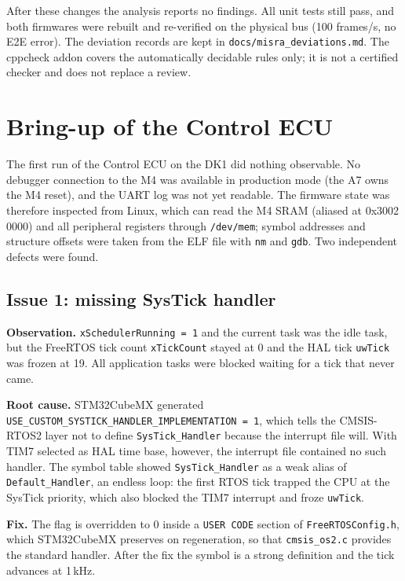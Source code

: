 After these changes the analysis reports no findings. All unit tests still pass, and both firmwares were rebuilt and re-verified on the physical bus (100 frames/s, no E2E error). The deviation records are kept in \texttt{docs/misra\_deviations.md}. The cppcheck addon covers the automatically decidable rules only; it is not a certified checker and does not replace a review.

\section{Bring-up of the Control ECU}
\label{sec:bringup}

The first run of the Control ECU on the DK1 did nothing observable. No debugger connection to the M4 was available in production mode (the A7 owns the M4 reset), and the UART log was not yet readable. The firmware state was therefore inspected from Linux, which can read the M4 SRAM (aliased at 0x3002\,0000) and all peripheral registers through \texttt{/dev/mem}; symbol addresses and structure offsets were taken from the ELF file with \texttt{nm} and \texttt{gdb}. Two independent defects were found.

\subsection{Issue 1: missing SysTick handler}

\textbf{Observation.} \texttt{xSchedulerRunning = 1} and the current task was the idle task, but the FreeRTOS tick count \texttt{xTickCount} stayed at 0 and the HAL tick \texttt{uwTick} was frozen at 19. All application tasks were blocked waiting for a tick that never came.

\textbf{Root cause.} STM32CubeMX generated \texttt{USE\_CUSTOM\_SYSTICK\_HANDLER\_IMPLEMENTATION = 1}, which tells the CMSIS-RTOS2 layer not to define \texttt{SysTick\_Handler} because the interrupt file will. With TIM7 selected as HAL time base, however, the interrupt file contained no such handler. The symbol table showed \texttt{SysTick\_Handler} as a weak alias of \texttt{Default\_Handler}, an endless loop: the first RTOS tick trapped the CPU at the SysTick priority, which also blocked the TIM7 interrupt and froze \texttt{uwTick}.

\textbf{Fix.} The flag is overridden to 0 inside a \texttt{USER CODE} section of \texttt{FreeRTOSConfig.h}, which STM32CubeMX preserves on regeneration, so that \texttt{cmsis\_os2.c} provides the standard handler. After the fix the symbol is a strong definition and the tick advances at 1\,kHz.

